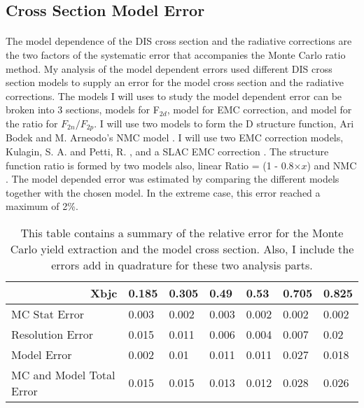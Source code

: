 \subsection{Cross Section Model Error}
\paragraph{}
The model dependence of the DIS cross section and the radiative corrections are the two factors of the systematic error that accompanies the Monte Carlo ratio method. My analysis of the model dependent errors used different DIS cross section models to supply an error for the model cross section and the radiative corrections. The models I will uses to study the model dependent error can be broken into 3 sections, models for F$_{2d}$, model for EMC correction, and model for the ratio for $F_{2n}/F_{2p}$. I will use two models to form the D structure function, Ari Bodek \cite{DISmodel} and M. Arneodo's NMC model \cite{NMC_model}. I will use two EMC correction models, Kulagin, S. A. and Petti, R. \cite{kpmodel}, and a SLAC EMC correction \cite{SLAC_bodek}. The structure function ratio is formed by two models also, linear Ratio = (1 - 0.8$\times x$) and NMC \cite{NMC_ratio}. The model depended error was estimated by comparing the different models together with the chosen model. In the extreme case, this error reached a maximum of 2\%.   
\begin{table}[]
	\caption{This table contains a summary of the relative error for the Monte Carlo yield extraction and the model cross section. Also, I include the errors add in quadrature for these two analysis parts. }
	\label{MC_ErrT}
	\begin{tabular}{|l|l|l|l|l|l|l|}
		\hline
		\multicolumn{1}{|r|}{\textbf{Xbjc}} & \textbf{0.185} & \textbf{0.305} & \textbf{0.49} & \textbf{0.53} & \textbf{0.705} & \textbf{0.825} \\ \hline
		MC Stat Error                           & 0.003          & 0.002          & 0.003         & 0.002         & 0.002          & 0.002          \\ \hline
		Resolution Error                       & 0.015          & 0.011          & 0.006         & 0.004         & 0.007          & 0.02           \\ \hline
		Model Error                    & 0.002          & 0.01           & 0.011         & 0.011         & 0.027          & 0.018          \\ \hline
		MC and Model Total Error   & 0.015          & 0.015          & 0.013         & 0.012         & 0.028          & 0.026          \\ \hline
	\end{tabular}
\end{table}

